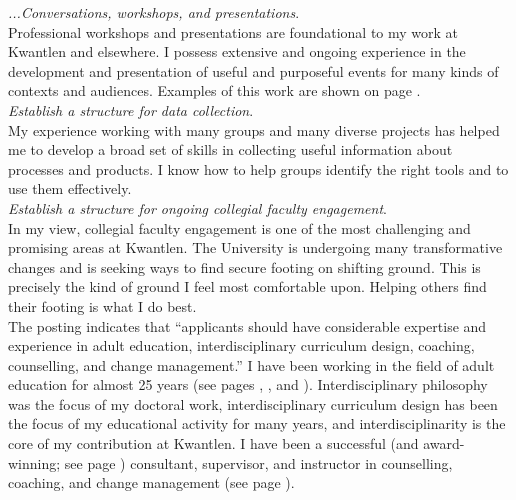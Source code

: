 \documentclass[10pt, a4paper]{article}
\begin{document}
\textit{...Conversations, workshops, and presentations}.\\
Professional workshops and presentations are foundational to my work at Kwantlen and elsewhere. I possess extensive and ongoing experience in the development and presentation of useful and purposeful events for many kinds of contexts and audiences. Examples of this work are shown on page \pageref{presentations}.\\

\textit{Establish a structure for data collection}.\\
My experience working with many groups and many diverse projects has helped me to develop a broad set of skills in collecting useful information about processes and products. I know how to help groups identify the right tools and to use them effectively.\\

\textit{Establish a structure for ongoing collegial faculty engagement}.\\
In my view, collegial faculty engagement is one of the most challenging and promising areas at Kwantlen. The University is undergoing many transformative changes and is seeking ways to find secure footing on shifting ground. This is precisely the kind of ground I feel most comfortable upon. Helping others find their footing is what I do best.\\

The posting indicates that ``applicants should have considerable expertise and experience in adult education, interdisciplinary curriculum design, coaching, counselling, and change management.'' I have been working in the field of adult education for almost 25 years (see pages \pageref{teaching}, \pageref{sample_consulting}, and \pageref{sample_supervision}). Interdisciplinary philosophy was the focus of my doctoral work, interdisciplinary curriculum design has been the focus of my educational activity for many years, and interdisciplinarity is the core of my contribution at Kwantlen. I have been a successful (and award-winning; see page \pageref{awards}) consultant, supervisor, and instructor in counselling, coaching, and change management (see page \pageref{sample_consulting}).\\
\end{document}
